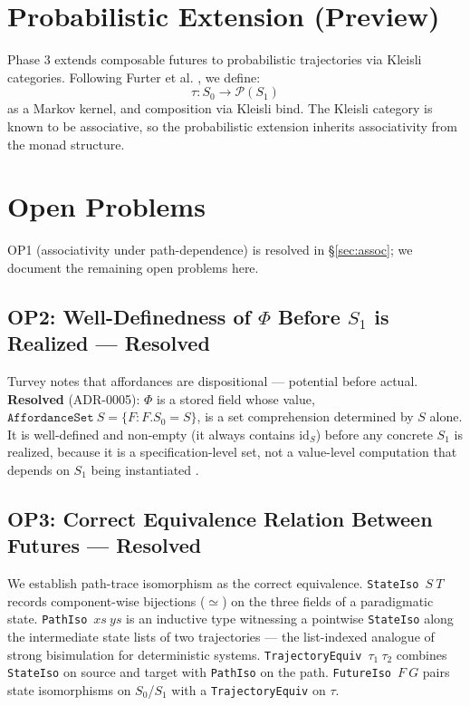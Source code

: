 \documentclass[11pt,a4paper]{article}
\newcommand{\id}{\text{id}}
\begin{document}
\section{Probabilistic Extension (Preview)}

Phase 3 extends composable futures to probabilistic trajectories via Kleisli categories. Following Furter et al. \cite{furter2025}, we define:
\[
\tau : S_0 \to \mathcal{P}(S_1)
\]
as a Markov kernel, and composition via Kleisli bind. The Kleisli category is known to be associative, so the probabilistic extension inherits associativity from the monad structure.

\section{Open Problems}

OP1 (associativity under path-dependence) is resolved in \S\ref{sec:assoc}; we
document the remaining open problems here.

\subsection{OP2: Well-Definedness of $\Phi$ Before $S_1$ is Realized — \textbf{Resolved}}

Turvey \cite{turvey1992} notes that affordances are dispositional --- potential
before actual. \textbf{Resolved} (ADR-0005): $\Phi$ is a stored field whose
value, $\texttt{AffordanceSet}~S = \{F : F.S_0 = S\}$, is a set comprehension
determined by $S$ alone. It is well-defined and non-empty (it always contains
$\id_S$) before any concrete $S_1$ is realized, because it is a specification-level
set, not a value-level computation that depends on $S_1$ being instantiated
.

\subsection{OP3: Correct Equivalence Relation Between Futures — \textbf{Resolved}}\label{sec:op3}

We establish path-trace isomorphism as the correct equivalence. \texttt{StateIso}~$S~T$ records component-wise bijections ($\simeq$) on the three fields of a paradigmatic state. \texttt{PathIso}~$xs~ys$ is an inductive type witnessing a pointwise \texttt{StateIso} along the intermediate state lists of two trajectories — the list-indexed analogue of strong bisimulation for deterministic systems. \texttt{TrajectoryEquiv}~$\tau_1~\tau_2$ combines \texttt{StateIso} on source and target with \texttt{PathIso} on the path. \texttt{FutureIso}~$F~G$ pairs state isomorphisms on $S_0$/$S_1$ with a \texttt{TrajectoryEquiv} on $\tau$.
\end{document}
